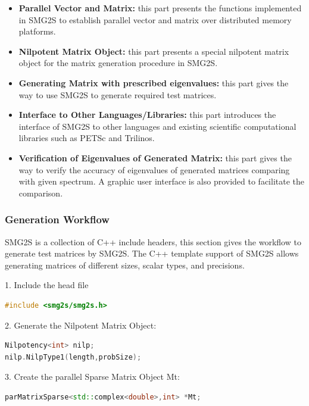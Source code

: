 \begin{itemize}
	\item \textbf{Parallel Vector and Matrix:} this part presents the functions implemented in SMG2S to establish parallel vector and matrix over distributed memory platforms.
	\item \textbf{Nilpotent Matrix Object:} this part presents a special nilpotent matrix object for the matrix generation procedure in SMG2S.
	\item \textbf{Generating Matrix with prescribed eigenvalues:} this part gives the way to use SMG2S to generate required test matrices.
	\item \textbf{Interface to Other Languages/Libraries:} this part introduces the interface of SMG2S to other languages and existing scientific computational libraries such as PETSc and Trilinos.
	\item \textbf{Verification of Eigenvalues of Generated Matrix:} this part gives the way to verify the accuracy of eigenvalues of generated matrices comparing with given spectrum. A graphic user interface is also provided to facilitate the comparison.
\end{itemize}

\subsubsection{Generation Workflow}

SMG2S is a collection of C++ include headers, this section gives the workflow to generate test matrices by SMG2S. The C++ template support of SMG2S allows generating matrices of different sizes, scalar types, and precisions.


1. Include the head file

\begin{lstlisting}[language=C++,frame=single]
#include <smg2s/smg2s.h>
\end{lstlisting}

2. Generate the Nilpotent Matrix Object:

\begin{lstlisting}[language=C++,frame=single]
Nilpotency<int> nilp;
nilp.NilpType1(length,probSize);
\end{lstlisting}

3. Create the parallel Sparse Matrix Object Mt:

\begin{lstlisting}[language=C++,frame=single]
parMatrixSparse<std::complex<double>,int> *Mt;
\end{lstlisting}

